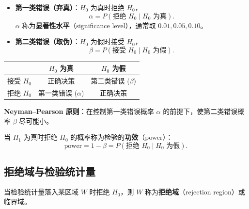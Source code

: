 \begin{definition}[第一类错误与第二类错误]

\begin{itemize}
    \item \textbf{第一类错误（弃真）}：$H_0$ 为真时拒绝 $H_0$，
    \begin{equation}
        \alpha = P(\text{拒绝 } H_0 \mid H_0 \text{ 为真}).
    \end{equation}
    $\alpha$ 称为\textbf{显著性水平}（significance level），通常取 $0.01, 0.05, 0.10$。

    \item \textbf{第二类错误（取伪）}：$H_0$ 为假时接受 $H_0$，
    \begin{equation}
        \beta = P(\text{接受 } H_0 \mid H_0 \text{ 为假}).
    \end{equation}
\end{itemize}
\end{definition}

\begin{center}
\begin{tabular}{c|c|c}
    \toprule
    & $H_0$ 为真 & $H_0$ 为假 \\
    \midrule
    接受 $H_0$ & 正确决策 & 第二类错误 ($\beta$) \\
    拒绝 $H_0$ & 第一类错误 ($\alpha$) & 正确决策 \\
    \bottomrule
\end{tabular}
\end{center}

\textbf{Neyman--Pearson 原则}：在控制第一类错误概率 $\alpha$ 的前提下，使第二类错误概率 $\beta$ 尽可能小。

\begin{definition}[检验的功效]
当 $H_1$ 为真时拒绝 $H_0$ 的概率称为检验的\textbf{功效}（power）：
\begin{equation}
    \text{power} = 1 - \beta = P(\text{拒绝 } H_0 \mid H_0 \text{ 为假}).
\end{equation}
\end{definition}

\subsection{拒绝域与检验统计量}

\begin{definition}[拒绝域]
当检验统计量落入某区域 $W$ 时拒绝 $H_0$，则 $W$ 称为\textbf{拒绝域}（rejection region）或临界域。
\end{definition}

